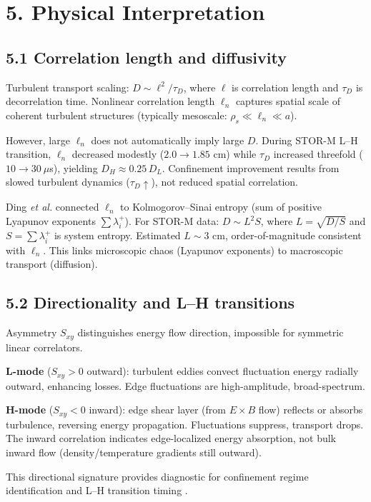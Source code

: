 \documentclass[11pt]{article}
\begin{document}
\section*{5. Physical Interpretation}

\subsection*{5.1 Correlation length and diffusivity}

Turbulent transport scaling: $D \sim \ell^2/\tau_D$, where $\ell$ is correlation length and $\tau_D$ is decorrelation time. Nonlinear correlation length $\ell_n$ captures spatial scale of coherent turbulent structures (typically mesoscale: $\rho_s \ll \ell_n \ll a$). 

However, large $\ell_n$ does not automatically imply large $D$. During STOR-M L–H transition, $\ell_n$ decreased modestly ($2.0 \to 1.85$ cm) while $\tau_D$ increased threefold ($10 \to 30~\mu$s), yielding $D_H \approx 0.25\,D_L$. Confinement improvement results from slowed turbulent dynamics ($\tau_D \uparrow$), not reduced spatial correlation.

Ding \textit{et al.} connected $\ell_n$ to Kolmogorov–Sinai entropy (sum of positive Lyapunov exponents $\sum \lambda_i^+$). For STOR-M data: $D \sim L^2 S$, where $L=\sqrt{D/S}$ and $S=\sum\lambda_i^+$ is system entropy. Estimated $L \sim 3$ cm, order-of-magnitude consistent with $\ell_n$. This links microscopic chaos (Lyapunov exponents) to macroscopic transport (diffusion).

\subsection*{5.2 Directionality and L–H transitions}

Asymmetry $S_{xy}$ distinguishes energy flow direction, impossible for symmetric linear correlators. 

\textbf{L-mode} ($S_{xy} > 0$ outward): turbulent eddies convect fluctuation energy radially outward, enhancing losses. Edge fluctuations are high-amplitude, broad-spectrum.

\textbf{H-mode} ($S_{xy} < 0$ inward): edge shear layer (from $E\times B$ flow) reflects or absorbs turbulence, reversing energy propagation. Fluctuations suppress, transport drops. The inward correlation indicates edge-localized energy absorption, not bulk inward flow (density/temperature gradients still outward).

This directional signature provides diagnostic for confinement regime identification and L–H transition timing \cite{vanmilligenCausalityDetectionTurbulence2013}.
\end{document}
